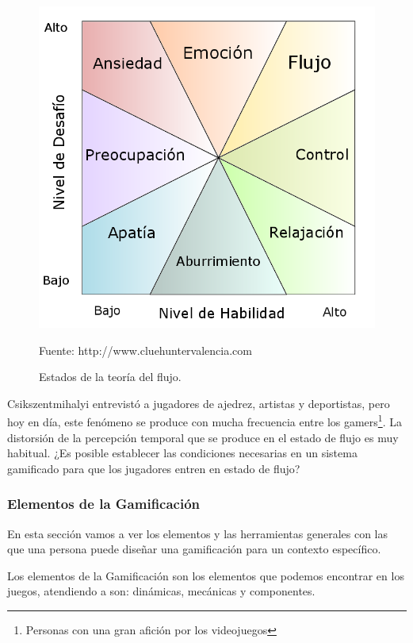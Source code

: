 \begin{figure}[hbt]
\begin{center}
\includegraphics[scale=0.40]{img/Flujo.png}
\caption{Estados de la teoría del flujo.}
\label{fig::Flujo}
\small{Fuente: http://www.cluehuntervalencia.com}
\end{center}
\vspace{-0.5cm}
\end{figure}
\FloatBarrier

Csikszentmihalyi entrevistó a jugadores de ajedrez, artistas y deportistas, pero hoy en día, este fenómeno se produce con mucha frecuencia entre los gamers\footnote{Personas con una gran afición por los videojuegos}.
%
La distorsión de la percepción temporal que se produce en el estado de flujo es muy habitual.
%
¿Es posible establecer las condiciones necesarias en un sistema gamificado para que los jugadores entren en estado de flujo?


\subsubsection{Elementos de la Gamificación}

En esta sección vamos a ver los elementos y las herramientas generales con las que una persona puede diseñar una gamificación para un contexto específico.

Los elementos de la Gamificación son los elementos que podemos encontrar en los juegos, atendiendo a \cite{kwerb-pyramid} son: dinámicas, mecánicas y componentes.

